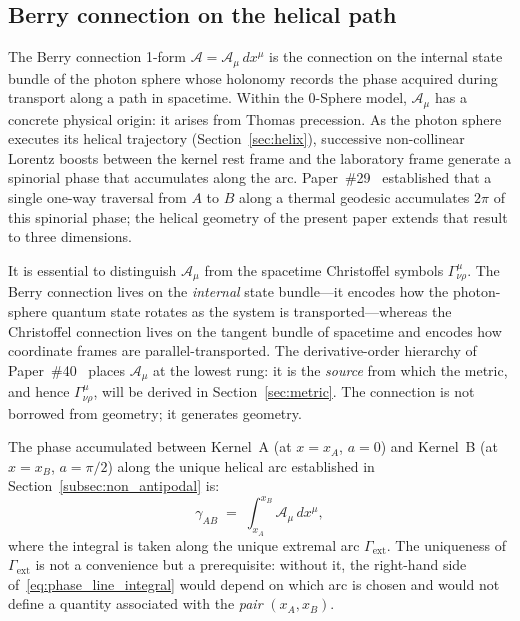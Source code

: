 \documentclass[%
 reprint, amsmath,amssymb, aps, prb, ]{revtex4-2}
\numberwithin{equation}{section}
\begin{document}
\subsection{Berry connection on the helical path}
\label{subsec:berry_connection}

The Berry connection 1-form $\mathcal{A} = \mathcal{A}_\mu\,dx^\mu$ is the connection on the internal state bundle of the photon sphere whose holonomy records the phase acquired during transport along a path in spacetime. Within the 0-Sphere model, $\mathcal{A}_\mu$ has a concrete physical origin: it arises from Thomas precession. As the photon sphere executes its helical trajectory (Section~\ref{sec:helix}), successive non-collinear Lorentz boosts between the kernel rest frame and the laboratory frame generate a spinorial phase that accumulates along the arc. Paper~\#29~\cite{hanamura29} established that a single one-way traversal from $A$ to $B$ along a thermal geodesic accumulates $2\pi$ of this spinorial phase; the helical geometry of the present paper extends that result to three dimensions.

It is essential to distinguish $\mathcal{A}_\mu$ from the spacetime Christoffel symbols $\Gamma^\mu_{\nu\rho}$. The Berry connection lives on the \emph{internal} state bundle---it encodes how the photon-sphere quantum state rotates as the system is transported---whereas the Christoffel connection lives on the tangent bundle of spacetime and encodes how coordinate frames are parallel-transported. The derivative-order hierarchy of Paper~\#40~\cite{hanamura40} places $\mathcal{A}_\mu$ at the lowest rung: it is the \emph{source} from which the metric, and hence $\Gamma^\mu_{\nu\rho}$, will be derived in Section~\ref{sec:metric}. The connection is not borrowed from geometry; it generates geometry.

The phase accumulated between Kernel~A (at $x = x_A$, $a = 0$) and Kernel~B (at $x = x_B$, $a = \pi/2$) along the unique helical arc established in Section~\ref{subsec:non_antipodal} is:
\begin{equation}
\gamma_{AB} \;=\; \int_{x_A}^{x_B} \mathcal{A}_\mu\, dx^\mu,
\label{eq:phase_line_integral}
\end{equation}
where the integral is taken along the unique extremal arc $\Gamma_{\mathrm{ext}}$. The uniqueness of $\Gamma_{\mathrm{ext}}$ is not a convenience but a prerequisite: without it, the right-hand side of~\eqref{eq:phase_line_integral} would depend on which arc is chosen and would not define a quantity associated with the \emph{pair} $(x_A, x_B)$.
\end{document}
